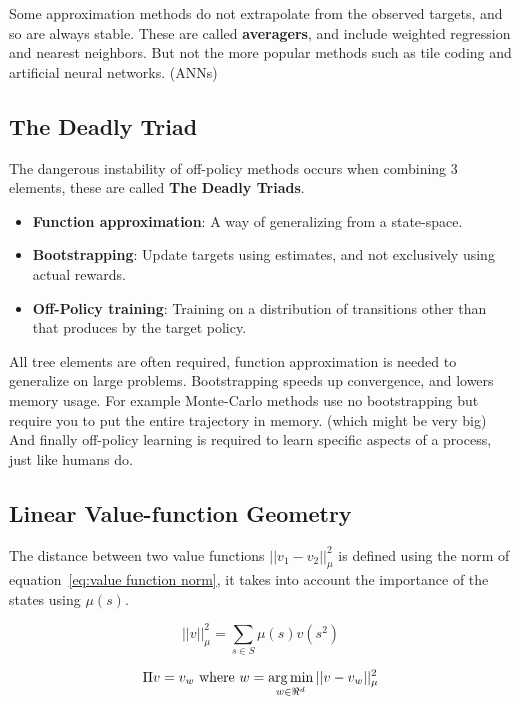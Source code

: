 Some approximation methods do not extrapolate from the observed targets, and so are always stable. These are called \textbf{averagers}, and include weighted regression and nearest neighbors. But not the more popular methods such as tile coding and artificial neural networks. (ANNs)

\subsection{The Deadly Triad}
The dangerous instability of off-policy methods occurs when combining 3 elements, these are called \textbf{The Deadly Triads}.

\begin{itemize}
	\item \textbf{Function approximation}: A way of generalizing from a state-space.
	\item \textbf{Bootstrapping}: Update targets using estimates, and not exclusively using actual rewards.
	\item \textbf{Off-Policy training}: Training on a distribution of transitions other than that produces by the target policy.
\end{itemize}

All tree elements are often required, function approximation is needed to generalize on large problems. Bootstrapping speeds up convergence, and lowers memory usage. For example Monte-Carlo methods use no bootstrapping but require you to put the entire trajectory in memory. (which might be very big) And finally off-policy learning is required to learn specific aspects of a process, just like humans do.

\subsection{Linear Value-function Geometry}
The distance between two value functions $||v_1 - v_2||^2_\mu$ is defined using the norm of equation~\ref{eq:value function norm}, it takes into account the importance of the states using $\mu(s)$.

\begin{equation}
||v||^2_\mu = \sum_{s\in S}\mu(s)v(s^2)
\label{eq:value function norm}
\end{equation}

\begin{equation}
\Pi v = v_w \text{ where } w=\operatorname*{arg\,min}_{w\in \Re^d}|| v-v_w ||^2_\mu
\label{eq:projection operator closes approximated value function}
\end{equation}

